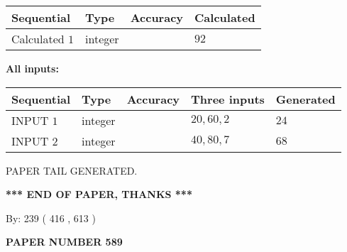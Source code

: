 \documentclass{ctexart}
\begin{document}
   
   
   
\noindent{}
   
   
  
  
\noindent\begin{tabular}{|l|l|l|l|}
\hline
 Sequential & Type & Accuracy & Calculated \\ 
\hline
 
 
  Calculated $  1 $ & integer &  & 
  $ 92 $ 
 \\  \hline  
 \end{tabular}
   
   
   
   
\noindent\vspace{0.1in}\hspace{-0.08in} {\textbf{\Large{All inputs: }}}
   
   
  
  
\noindent\begin{tabular}{|l|l|l|l|l|}
\hline
 Sequential & Type & Accuracy & Three inputs & Generated \\ 
\hline
 
 
  INPUT $  1 $ & integer &  & $
 20
 , 
 60
 , 
 2
 $ & $ 24 $ 
 \\  \hline  
 
 
  INPUT $  2 $ & integer &  & $
 40
 , 
 80
 , 
 7
 $ & $ 68 $ 
 \\  \hline  
 \end{tabular}
   
   
   
   
   
   
 \vspace{0.2in}
 
   
   
\vspace{2.0in} PAPER TAIL GENERATED.
   
   
   
   
\vspace{1.0in} 
{\textbf{\large{ *** END OF PAPER, THANKS *** }}} 
   
   
\hspace{1.0in} By: 
 239 ( 416 ,  613 )
   
   
   
   
\newpage 
\setcounter{page}{ 
   589001 } 
   
   
   
   
 {\textbf{ \Large{ PAPER NUMBER  589  }}}
   
\end{document}
